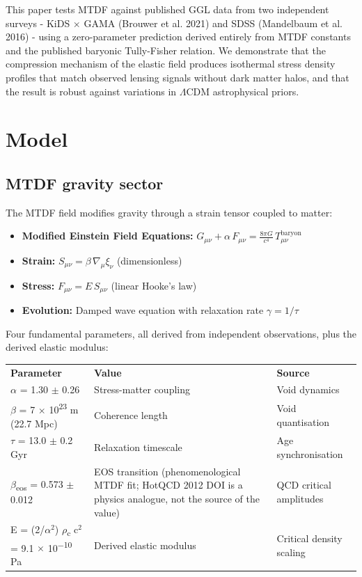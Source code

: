 \documentclass[11pt,a4paper]{article}
\begin{document}
This paper tests MTDF against published GGL data from two independent surveys  -  KiDS $\times$ GAMA (Brouwer et al. 2021) and SDSS (Mandelbaum et al. 2016)  -  using a zero-parameter prediction derived entirely from MTDF constants and the published baryonic Tully-Fisher relation. We demonstrate that the compression mechanism of the elastic field produces isothermal stress density profiles that match observed lensing signals without dark matter halos, and that the result is robust against variations in $\Lambda$CDM astrophysical priors.

\section{Model}
\label{sec:model}

\subsection{MTDF gravity sector}
The MTDF field modifies gravity through a strain tensor coupled to matter:

\begin{itemize}
  \item \textbf{Modified Einstein Field Equations:} \(G_{\mu\nu} + \alpha\,F_{\mu\nu} = \frac{8\pi G}{c^4}\,T_{\mu\nu}^{\mathrm{baryon}}\)
  \item \textbf{Strain:} \(S_{\mu\nu} = \beta\,\nabla_\mu\xi_\nu\) (dimensionless)
  \item \textbf{Stress:} \(F_{\mu\nu} = E\,S_{\mu\nu}\) (linear Hooke's law)
  \item \textbf{Evolution:} Damped wave equation with relaxation rate \(\gamma = 1/\tau\)
\end{itemize}

Four fundamental parameters, all derived from independent observations, plus the derived elastic modulus:

\begin{table}[H]
\centering
\footnotesize
\begin{tabularx}{\linewidth}{l>{\RaggedRight\arraybackslash}X>{\RaggedRight\arraybackslash}X}
\toprule
\textbf{Parameter} & \textbf{Value} & \textbf{Source} \tabularnewline
$\alpha$ = 1.30 $\pm$ 0.26 & Stress-matter coupling & Void dynamics \tabularnewline
$\beta$ = 7 $\times$ 10\textsuperscript{23} m (22.7 Mpc) & Coherence length & Void quantisation \tabularnewline
$\tau$ = 13.0 $\pm$ 0.2 Gyr & Relaxation timescale & Age synchronisation \tabularnewline
$\beta$\textsubscript{eos} = 0.573 $\pm$ 0.012 & EOS transition (phenomenological MTDF fit; HotQCD 2012 DOI is a physics analogue, not the source of the value) & QCD critical amplitudes \tabularnewline
E = (2/\allowbreak{}$\alpha$$^{2}$) $\rho$\textsubscript{c} c$^{2}$ = 9.1 $\times$ 10\textsuperscript{$-$10} Pa & Derived elastic modulus & Critical density scaling \tabularnewline
\bottomrule
\end{tabularx}
\end{table}
\end{document}
